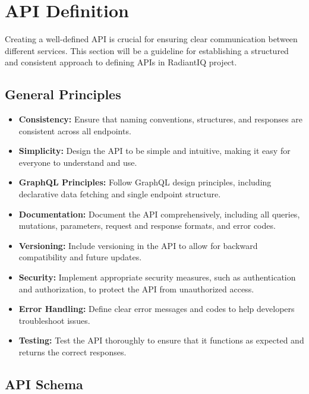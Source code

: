 \section{API Definition} \label{api_definition}

Creating a well-defined API is crucial for ensuring clear communication between different services. This section will be a guideline for establishing a structured and consistent approach to defining APIs in RadiantIQ project.

\subsection{General Principles}

\begin{itemize}
    \item \textbf{Consistency:} Ensure that naming conventions, structures, and responses are consistent across all endpoints.
    \item \textbf{Simplicity:} Design the API to be simple and intuitive, making it easy for everyone to understand and use.
    \item \textbf{GraphQL Principles:} Follow GraphQL design principles, including declarative data fetching and single endpoint structure.
    \item \textbf{Documentation:} Document the API comprehensively, including all queries, mutations, parameters, request and response formats, and error codes.
    \item \textbf{Versioning:} Include versioning in the API to allow for backward compatibility and future updates.
    \item \textbf{Security:} Implement appropriate security measures, such as authentication and authorization, to protect the API from unauthorized access.
    \item \textbf{Error Handling:} Define clear error messages and codes to help developers troubleshoot issues.
    \item \textbf{Testing:} Test the API thoroughly to ensure that it functions as expected and returns the correct responses.
\end{itemize}

\subsection{API Schema}

